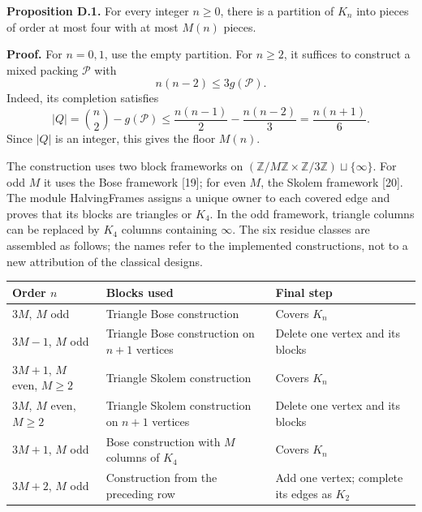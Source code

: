 \documentclass[english,11pt,a4paper]{article}
\newcounter{none}
\begin{document}
\textbf{Proposition D.1.} For every integer \(n\ge0\), there is a partition of \(K_n\) into pieces of order at most four with at most \(M(n)\) pieces.

\textbf{Proof.} For \(n=0,1\), use the empty partition. For \(n\ge2\), it suffices to construct a mixed packing \(\mathcal P\) with \[
n(n-2)\le3g(\mathcal P).
\tag{D.1}
\] Indeed, its completion satisfies \[
|Q|=\binom n2-g(\mathcal P)
\le\frac{n(n-1)}2-\frac{n(n-2)}3
=\frac{n(n+1)}6.
\tag{D.2}
\] Since \(|Q|\) is an integer, this gives the floor \(M(n)\).

The construction uses two block frameworks on \((\mathbb Z/M\mathbb Z\times\mathbb Z/3\mathbb Z)\sqcup\{\infty\}\). For odd \(M\) it uses the Bose framework {[}19{]}; for even \(M\), the Skolem framework {[}20{]}. The module {\ttfamily\small HalvingFrame\discretionary{\hbox{\ensuremath{\hookrightarrow}}}{}{}s} assigns a unique owner to each covered edge and proves that its blocks are triangles or \(K_4\). In the odd framework, triangle columns can be replaced by \(K_4\) columns containing \(\infty\). The six residue classes are assembled as follows; the names refer to the implemented constructions, not to a new attribution of the classical designs.


{\def\LTcaptype{none} %
\begin{longtable}[c]{@{}
  >{\raggedright\arraybackslash}p{}
  >{\raggedright\arraybackslash}p{}
  >{\raggedright\arraybackslash}p{}@{}}
\toprule\noalign{}
\begin{minipage}[b]{\linewidth}\raggedright
Order \(n\)
\end{minipage} & \begin{minipage}[b]{\linewidth}\raggedright
Blocks used
\end{minipage} & \begin{minipage}[b]{\linewidth}\raggedright
Final step
\end{minipage} \\
\midrule\noalign{}
\endhead
\bottomrule\noalign{}
\endlastfoot
\(3M\), \(M\) odd & Triangle Bose construction & Covers \(K_n\) \\
\(3M-1\), \(M\) odd & Triangle Bose construction on \(n+1\) vertices & Delete one vertex and its blocks \\
\(3M+1\), \(M\) even, \(M\ge2\) & Triangle Skolem construction & Covers \(K_n\) \\
\(3M\), \(M\) even, \(M\ge2\) & Triangle Skolem construction on \(n+1\) vertices & Delete one vertex and its blocks \\
\(3M+1\), \(M\) odd & Bose construction with \(M\) columns of \(K_4\) & Covers \(K_n\) \\
\(3M+2\), \(M\) odd & Construction from the preceding row & Add one vertex; complete its edges as \(K_2\) \\
\end{longtable}
}
\end{document}
